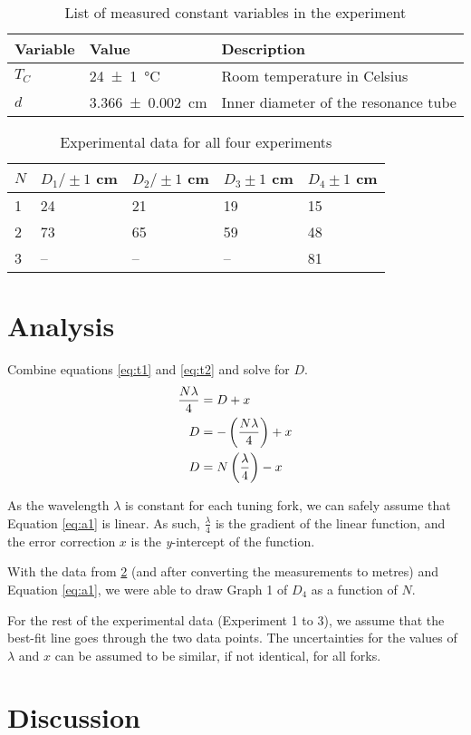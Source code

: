 \documentclass[letter]{article}
\numberwithin{equation}{section}
\begin{document}
\begin{table}[!h]
  \centering
  \begin{tabular}{|l|l|l|}
    \hline
    Variable  & Value                       & Description\\
    \hline
    \(T_C\)   & \SI{24(1)}{\celsius}        & {Room temperature in Celsius}\\
    \(d\)     & \SI{3.366(2)}{\centi\metre} & {Inner diameter of the resonance tube}\\
    \hline
  \end{tabular}
  \caption{List of measured constant variables in the experiment}
  \label{table:d2}
\end{table}

\begin{table}[!h]
  \centering
  \begin{tabular}{|l|l|l|l|l|}
    \hline
    \(N\) & \(D_1 / \pm 1\) \si{cm} & \(D_2 / \pm 1\) \si{cm} & \(D_3 \pm 1\) \si{cm} & \(D_4 \pm 1\) \si{cm} \\
    \hline
    1  & 24  & 21  & 19  & 15 \\
    2  & 73  & 65  & 59  & 48 \\
    3  & --  & --  & --  & 81 \\
    \hline
  \end{tabular}
  \caption{Experimental data for all four experiments}
  \label{table:d3}
\end{table}

\section{Analysis}
Combine equations \eqref{eq:t1} and \eqref{eq:t2} and solve for \(D\).
\begin{align} \label{eq:a1}
  \frac{N \lambda}{4} &= D + x \notag \\
  D &= - \left (\frac{N \lambda}{4} \right) + x \notag \\
  D &= N \left(\frac{\lambda}{4} \right) - x
\end{align}

As the wavelength \(\lambda\) is constant for each tuning fork, we can safely assume that Equation \eqref{eq:a1} is linear. As such, \(\frac{\lambda}{4}\) is the gradient of the linear function, and the error correction \(x\) is the \textit{y}-intercept of the function.

With the data from \ref{table:d3} (and after converting the measurements to metres) and Equation \eqref{eq:a1}, we were able to draw Graph 1 of \(D_4\) as a function of \(N\). 


For the rest of the experimental data (Experiment 1 to 3), we assume that the best-fit line goes through the two data points. The uncertainties for the values of \(\lambda\) and \(x\) can be assumed to be similar, if not identical, for all forks. 

\section{Discussion}
\end{document}
